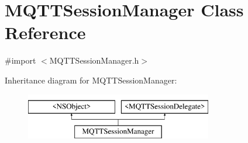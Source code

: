 \hypertarget{interface_m_q_t_t_session_manager}{}\section{M\+Q\+T\+T\+Session\+Manager Class Reference}
\label{interface_m_q_t_t_session_manager}


{\ttfamily \#import $<$M\+Q\+T\+T\+Session\+Manager.\+h$>$}

Inheritance diagram for M\+Q\+T\+T\+Session\+Manager\+:\begin{figure}[H]
\begin{center}
\leavevmode
\includegraphics[height=2.000000cm]{interface_m_q_t_t_session_manager}
\end{center}
\end{figure}
